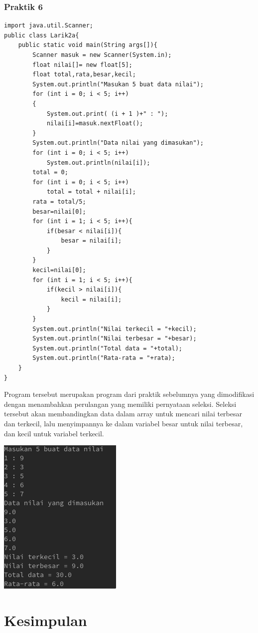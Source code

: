 \documentclass[a4paper,12pt]{article}
\begin{document}
\subsubsection{Praktik 6}
\begin{lstlisting}
import java.util.Scanner;
public class Larik2a{
    public static void main(String args[]){
        Scanner masuk = new Scanner(System.in);
        float nilai[]= new float[5];
        float total,rata,besar,kecil;
        System.out.println("Masukan 5 buat data nilai");
        for (int i = 0; i < 5; i++)
        {
            System.out.print( (i + 1 )+" : ");
            nilai[i]=masuk.nextFloat();
        }
        System.out.println("Data nilai yang dimasukan");
        for (int i = 0; i < 5; i++)
            System.out.println(nilai[i]);
        total = 0;
        for (int i = 0; i < 5; i++)
            total = total + nilai[i];
        rata = total/5;
        besar=nilai[0];
        for (int i = 1; i < 5; i++){
            if(besar < nilai[i]){
                besar = nilai[i];
            }
        }
        kecil=nilai[0];
        for (int i = 1; i < 5; i++){
            if(kecil > nilai[i]){
                kecil = nilai[i];
            }
        }
        System.out.println("Nilai terkecil = "+kecil);
        System.out.println("Nilai terbesar = "+besar);
        System.out.println("Total data = "+total);
        System.out.println("Rata-rata = "+rata);
    }
}
\end{lstlisting}
Program tersebut merupakan program dari praktik sebelumnya yang dimodifikasi dengan menambahkan perulangan yang memiliki pernyataan seleksi. Seleksi tersebut akan membandingkan data dalam 
array untuk mencari nilai terbesar dan terkecil, lalu menyimpannya ke dalam variabel besar untuk nilai terbesar, dan kecil untuk variabel terkecil.
\begin{center}
    \includegraphics[scale=.7]{5.png}
\end{center}

\newpage
\section{Kesimpulan}
\end{document}

